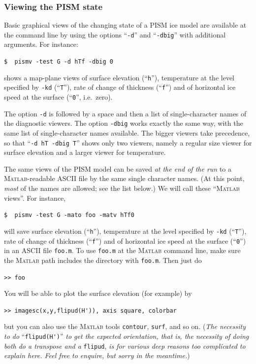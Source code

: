 \documentclass[11pt,final]{amsart}
\renewcommand{\t}[1]{\texttt{#1}}
\newcommand{\Matlab}{\textsc{Matlab}\xspace}
\begin{document}
\subsubsection*{Viewing the PISM state}  Basic graphical views of the changing state of a PISM ice model are available at the command line by using the options ``\t{-d}'' and ``\t{-dbig}'' with additional arguments.  For instance:

\verb|$  pismv -test G -d hTf -dbig 0|

\noindent shows a map-plane views of surface elevation (``\t{h}''), temperature at the level specified by \t{-kd} (``\t{T}''), rate of change of thickness (``\t{f}'') and of horizontal ice speed at the surface (``\t{0}'', i.e.~zero).

The option \t{-d} is followed by a space and then a list of single-character names of the diagnostic viewers.  The option \t{-dbig} works exactly the same way, with the same list of single-character names available.  The bigger viewers take precedence, so that ``\t{-d hT -dbig T}'' shows only two viewers, namely a regular size viewer for surface elevation and a larger viewer for temperature.
\medskip

The same views of the PISM model can be saved \emph{at the end of the run} to a \Matlab-readable ASCII file by the same single character names.  (At this point, \emph{most} of the names are allowed; see the list below.)  We will call these ``\Matlab views''.  For instance,

\verb|$  pismv -test G -mato foo -matv hTf0|

\noindent will save surface elevation (``\t{h}''), temperature at the level specified by \t{-kd} (``\t{T}''), rate of change of thickness (``\t{f}'') and of horizontal ice speed at the surface (``\t{0}'') in an ASCII file \verb|foo.m|.  To use \verb|foo.m| at the \Matlab command line, make sure the \Matlab path includes the directory with \verb|foo.m|.  Then just do

\verb|>> foo|

\noindent You will be able to plot the surface elevation (for example) by

\verb|>> imagesc(x,y,flipud(H')), axis square, colorbar|

\noindent but you can also use the \Matlab tools \verb|contour|, \verb|surf|, and so on.  (\emph{The necessity to do} ``\verb|flipud(H')|'' \emph{to get the expected orientation, that is, the necessity of doing both do a transpose \emph{and} a} \verb|flipud|, \emph{is for various deep reasons too complicated to explain here.  Feel free to enquire, but \emph{sorry} in the meantime.})
\end{document}
